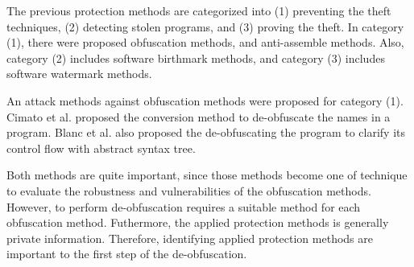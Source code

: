 \documentclass[conference]{IEEEtran}
\begin{document}
The previous protection methods are categorized into (1) preventing
the theft techniques, (2) detecting stolen programs, and (3) proving
the theft\cite{collberg09surreptitious}.
%
In category (1), there were proposed obfuscation methods, and
anti-assemble methods\cite{tyma00patent,monden97ieice}.  Also,
category (2) includes software birthmark
methods\cite{tamada05ieice}, and category (3) includes software
watermark methods\cite{collberg99popl}.

An attack methods against obfuscation methods were proposed for
category (1)\cite{cimato05jss}.
%
Cimato et al. proposed the conversion method to de-obfuscate the names
in a program.
%
Blanc et al. also proposed the de-obfuscating the program to clarify
its control flow with abstract syntax tree\cite{preda06amast}.

Both methods are quite important, since those methods become one of
technique to evaluate the robustness and vulnerabilities of the
obfuscation methods.  However, to perform de-obfuscation requires a
suitable method for each obfuscation method.  Futhermore, the applied
protection methods is generally private information.  Therefore,
identifying applied protection methods are important to the first step
of the de-obfuscation.

% 
\end{document}

